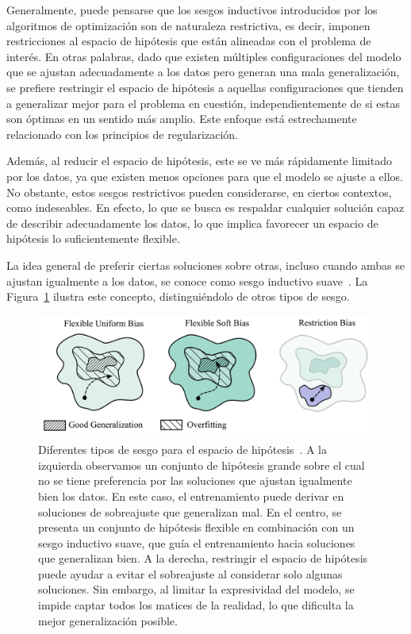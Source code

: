 Generalmente, puede pensarse que los sesgos inductivos introducidos por los algoritmos de optimización son de naturaleza restrictiva, es decir, imponen restricciones al espacio de hipótesis que están alineadas con el problema de interés. En otras palabras, dado que existen múltiples configuraciones del modelo que se ajustan adecuadamente a los datos pero generan una mala generalización, se prefiere restringir el espacio de hipótesis a aquellas configuraciones que tienden a generalizar mejor para el problema en cuestión, independientemente de si estas son óptimas en un sentido más amplio. Este enfoque está estrechamente relacionado con los principios de regularización.\newline

Además, al reducir el espacio de hipótesis, este se ve más rápidamente limitado por los datos, ya que existen menos opciones para que el modelo se ajuste a ellos. No obstante, estos sesgos restrictivos pueden considerarse, en ciertos contextos, como indeseables. En efecto, lo que se busca es respaldar cualquier solución capaz de describir adecuadamente los datos, lo que implica favorecer un espacio de hipótesis lo suficientemente flexible.\newline

La idea general de preferir ciertas soluciones sobre otras, incluso cuando ambas se ajustan igualmente a los datos, se conoce como sesgo inductivo suave~\cite{Wilson2025}. La Figura~\ref{fig:types-of-bias} ilustra este concepto, distinguiéndolo de otros tipos de sesgo.

\begin{figure}[h]
    \centering
    \includegraphics[width=0.6\linewidth]{img/types-of-bias.png}
    \caption[Diferentes tipos de sesgo para el espacio de hipótesis~\cite{Wilson2025}.]{Diferentes tipos de sesgo para el espacio de hipótesis~\cite{Wilson2025}. A la izquierda observamos un conjunto de hipótesis grande sobre el cual no se tiene preferencia por las soluciones que ajustan igualmente bien los datos. En este caso, el entrenamiento puede derivar en soluciones de sobreajuste que generalizan mal. En el centro, se presenta un conjunto de hipótesis flexible en combinación con un sesgo inductivo suave, que guía el entrenamiento hacia soluciones que generalizan bien. A la derecha, restringir el espacio de hipótesis puede ayudar a evitar el sobreajuste al considerar solo algunas soluciones. Sin embargo, al limitar la expresividad del modelo, se impide captar todos los matices de la realidad, lo que dificulta la mejor generalización posible.}\label{fig:types-of-bias}
\end{figure}

